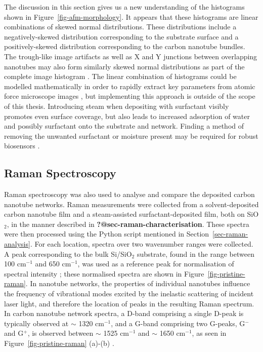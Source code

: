 \documentclass[
  a4paper,
]{scrbook}
\begin{document}
The discussion in this section gives us a new understanding of the
histograms shown in Figure~\ref{fig-afm-morphology}. It appears that
these histograms are linear combinations of skewed normal distributions.
These distributions include a negatively-skewed distribution
corresponding to the substrate surface and a positively-skewed
distribution corresponding to the carbon nanotube bundles. The
trough-like image artifacts as well as X and Y junctions between
overlapping nanotubes may also form similarly skewed normal
distributions as part of the complete image histogram
\autocite{Murugathas2018}. The linear combination of histograms could be
modelled mathematically in order to rapidly extract key parameters from
atomic force microscope images \autocite{Marchenko2010}, but
implementing this approach is outside of the scope of this thesis.
Introducing steam when depositing with surfactant visibly promotes even
surface coverage, but also leads to increased adsorption of water and
possibly surfactant onto the substrate and network. Finding a method of
removing the unwanted surfactant or moisture present may be required for
robust biosensors \autocite{Kane2014,Barnett2018}.

\hypertarget{sec-pristine-raman}{%
\subsection{Raman Spectroscopy}\label{sec-pristine-raman}}

Raman spectroscopy was also used to analyse and compare the deposited
carbon nanotube networks. Raman measurements were collected from a
solvent-deposited carbon nanotube film and a steam-assisted
surfactant-deposited film, both on SiO\(_2\), in the manner described in
\textbf{?@sec-raman-characterisation}. These spectra were then processed
using the Python script mentioned in Section~\ref{sec-raman-analysis}.
For each location, spectra over two wavenumber ranges were collected. A
peak corresponding to the bulk Si/SiO\(_2\) substrate, found in the
range between 100 cm\(^{-1}\) and 650 cm\(^{-1}\), was used as a
reference peak for normalisation of spectral intensity \autocite{E2015};
these normalised spectra are shown in Figure~\ref{fig-pristine-raman}.
In nanotube networks, the properties of individual nanotubes influence
the frequency of vibrational modes excited by the inelastic scattering
of incident laser light, and therefore the location of peaks in the
resulting Raman spectrum. In carbon nanotube network spectra, a D-band
comprising a single D-peak is typically observed at \(\sim\) 1320
cm\(^{-1}\), and a G-band comprising two G-peaks, G\(^-\) and G\(^+\),
is observed between \(\sim\) 1525 cm\(^{-1}\) and \(\sim\) 1650
cm\(^{-1}\), as seen in Figure~\ref{fig-pristine-raman} (a)-(b)
\autocite{Dresselhaus2005,King2014,E2015}.
\end{document}
